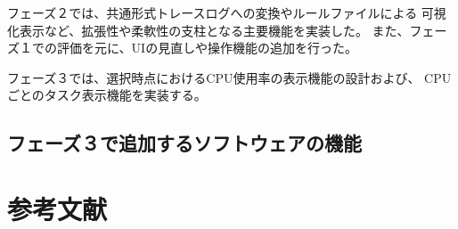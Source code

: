 \documentclass[a4j]{jsarticle}
\begin{document}
フェーズ２では、共通形式トレースログへの変換やルールファイルによる
可視化表示など、拡張性や柔軟性の支柱となる主要機能を実装した。
また、フェーズ１での評価を元に、UIの見直しや操作機能の追加を行った。

フェーズ３では、選択時点におけるCPU使用率の表示機能の設計および、
CPUごとのタスク表示機能を実装する。

\subsection{フェーズ３で追加するソフトウェアの機能}



\clearpage
\section*{参考文献}
\end{document}
